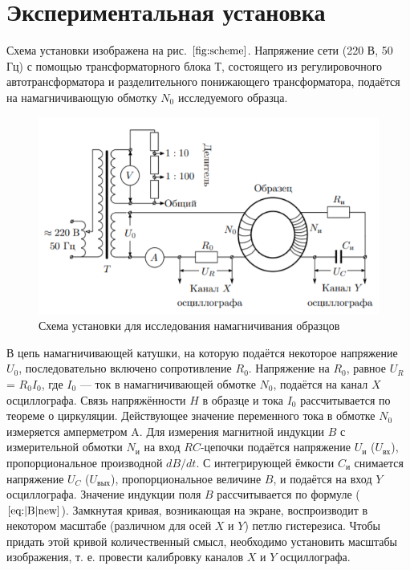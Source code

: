 \documentclass[a4paper,12pt]{article} %
\begin{document}
\section{Экспериментальная установка}

Схема установки изображена на рис. $\ref{fig:scheme}$. Напряжение сети (220 В,
50 Гц) с помощью трансформаторного блока Т, состоящего из регулировочного автотрансформатора и разделительного понижающего трансформатора, подаётся на намагничивающую обмотку $N_0$ исследуемого образца.
\begin{figure}[h!]
	\centering
	\includegraphics{scheme.png}
	\caption{ Схема установки для исследования намагничивания образцов}
	\label{fig:scheme}
\end{figure}

В цепь намагничивающей катушки, на которую подаётся некоторое
напряжение $U_0$, последовательно включено сопротивление $R_0$. Напряжение на $R_0$, равное $U_R$= $R_0I_0$, где $I_0$ — ток в намагничивающей обмотке $N_0$, подаётся на канал $ X $ осциллографа. Связь напряжённости $ H $ в
образце и тока $I_0$ рассчитывается по теореме о циркуляции. 
Действующее значение переменного тока в обмотке $N_0$ измеряется амперметром A.
Для измерения магнитной индукции $ B $ с измерительной обмотки $N_\text{и}$
на вход $ RC $-цепочки подаётся напряжение $U_\text{и}$ ($U_{\text{вх}}$), пропорциональное
производной $ dB/dt $. С интегрирующей ёмкости $C_\text{и}$ снимается напряжение $U_C$ ($U_{\text{вых}}$), пропорциональное величине $ B $, и подаётся на вход $ Y $
осциллографа. Значение индукции поля $ B $ рассчитывается по формуле ($\ref{eq:|B|new}$).
Замкнутая кривая, возникающая на экране, воспроизводит в некотором масштабе (различном для осей $ X $ и $ Y $) петлю гистерезиса. Чтобы придать этой кривой количественный смысл, необходимо установить
масштабы изображения, т. е. провести калибровку каналов $ X $ и $ Y $ осциллографа.
\end{document}
